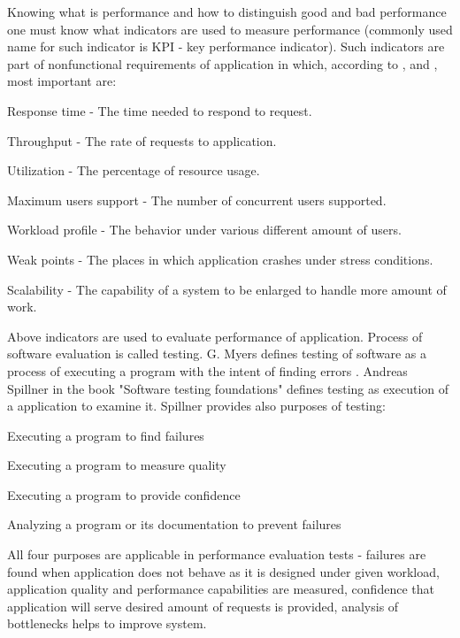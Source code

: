 \documentclass[10pt,a4paper]{article}
\let\tempone\itemize
\let\temptwo\enditemize
\renewenvironment{itemize}{\tempone\addtolength{\itemsep}{-0.4\baselineskip}}{\temptwo}
\begin{document}
Knowing what is performance and how to distinguish good and bad performance one must know what indicators are used to measure performance (commonly used name for such indicator is KPI - key performance indicator). Such indicators are part of nonfunctional requirements of application in which, according to \cite{artperformance}, \cite{analysisofpet} and \cite{petmethodsandtools},  most important are:  
\begin{itemize}
\item Response time - The time needed to respond to request.
\item Throughput - The rate of requests to application.
\item Utilization - The percentage of resource usage.
\item Maximum users support - The number of concurrent users supported.
\item Workload profile - The behavior under various different amount of users.
\item Weak points - The places in which application crashes under stress conditions.
\item Scalability - The capability of a system to be enlarged to handle more amount of work.
\end{itemize}

Above indicators are used to evaluate performance of application. Process of software evaluation is called testing. G. Myers defines testing of software as a process of executing a program with the intent of finding errors \cite{arttest}. Andreas Spillner in the book "Software testing foundations" \cite{testfoundations} defines testing as execution of a application to examine it. Spillner provides also purposes of testing: 
\begin{itemize}
\item Executing a program to find failures
\item Executing a program to measure quality
\item Executing a program to provide confidence 
\item Analyzing a program or its documentation to prevent failures
\end{itemize}

All four purposes are applicable in performance evaluation tests - failures are found when application does not behave as it is designed under given workload, application quality and performance capabilities are measured, confidence that application will serve desired amount of requests is provided, analysis of bottlenecks helps to improve system. 
\end{document}

